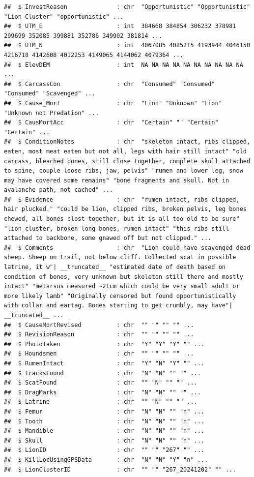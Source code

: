 \documentclass[
]{book}
\begin{document}
\begin{verbatim}
##  $ InvestReason              : chr  "Opportunistic" "Opportunistic" "Lion Cluster" "opportunistic" ...
##  $ UTM_E                     : int  384668 384854 306232 378981 299699 352085 399881 352786 349902 381814 ...
##  $ UTM_N                     : int  4067085 4085215 4193944 4046150 4216718 4142608 4012253 4149065 4144062 4079364 ...
##  $ ElevDEM                   : int  NA NA NA NA NA NA NA NA NA NA ...
##  $ CarcassCon                : chr  "Consumed" "Consumed" "Consumed" "Scavenged" ...
##  $ Cause_Mort                : chr  "Lion" "Unknown" "Lion" "Unknown not Predation" ...
##  $ CausMortAcc               : chr  "Certain" "" "Certain" "Certain" ...
##  $ ConditionNotes            : chr  "skeleton intact, ribs clipped, eaten, most meat eaten but not all, legs with hair still intact" "old carcass, bleached bones, still close together, complete skull attached to spine, couple loose ribs, jaw, pelvis" "rumen and lower leg, snow may have covered some remains" "bone fragments and skull. Not in avalanche path, not cached" ...
##  $ Evidence                  : chr  "rumen intact, ribs clipped, hair plucked." "could be lion, clipped ribs, broken pelvis, leg bones chewed, all bones clost together, but it is all too old to be sure" "lion cluster, broken long bones, rumen intact" "this ribs still attached to backbone, some gnawed off but not clipped." ...
##  $ Comments                  : chr  "Lion could have scavenged dead sheep. Sheep on trail, not below cliff. Collected scat in possible latrine, it w"| __truncated__ "estimated date of death based on condition of bones, very unknown but skeleton still there and mostly intact" "metarsus measured ~21cm which could be very small adult or more likely lamb" "Originally censored but found opportunistically with collar and eartag. Bones starting to get crumbly, may have"| __truncated__ ...
##  $ CauseMortRevised          : chr  "" "" "" "" ...
##  $ RevisionReason            : chr  "" "" "" "" ...
##  $ PhotoTaken                : chr  "Y" "Y" "Y" "" ...
##  $ Houndsmen                 : chr  "" "" "" "" ...
##  $ RumenIntact               : chr  "Y" "N" "Y" "" ...
##  $ TracksFound               : chr  "N" "N" "" "" ...
##  $ ScatFound                 : chr  "" "N" "" "" ...
##  $ DragMarks                 : chr  "N" "N" "" "" ...
##  $ Latrine                   : chr  "" "N" "" "" ...
##  $ Femur                     : chr  "N" "N" "" "n" ...
##  $ Tooth                     : chr  "N" "N" "" "n" ...
##  $ Mandible                  : chr  "N" "N" "" "n" ...
##  $ Skull                     : chr  "N" "N" "" "n" ...
##  $ LionID                    : chr  "" "" "267" "" ...
##  $ KillLocUsingGPSData       : chr  "N" "N" "Y" "n" ...
##  $ LionClusterID             : chr  "" "" "267_20241202" "" ...
\end{verbatim}
\end{document}
